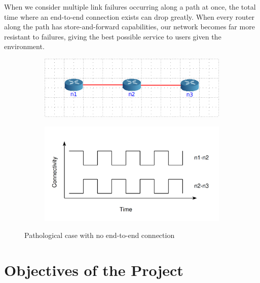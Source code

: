 \documentclass[withindex,glossary,openany]{cam-thesis}
\begin{document}
When we consider multiple link failures occurring along a path at once, the total time where an end-to-end connection exists can drop greatly. When every router along the path has store-and-forward capabilities, our network becomes far more resistant to failures, giving the best possible service to users given the environment.

\begin{center}
\begin{minipage}{0.9\textwidth} \centering
\begin{figure}[H]
\centering
\begin{subfigure}{.45\textwidth}
  \centering
  \includegraphics[width=1\linewidth]{pathalogical_topology}
  \label{fig:pathalogical_topology}
\end{subfigure}%
\begin{subfigure}{.55\textwidth}
  \centering
  \includegraphics[width=1\linewidth]{pathalogical_graph}
  \label{fig:pathalogical_graph}
\end{subfigure}
\caption{Pathological case with no end-to-end connection}
\label{fig:pathalogical}
\end{figure}
\end{minipage}
\end{center}

\section{Objectives of the Project}
\end{document}
